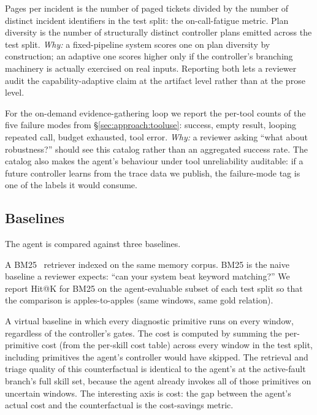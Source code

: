  Pages per incident is the number of paged tickets divided by the number of distinct incident identifiers in the test split: the on-call-fatigue metric. Plan diversity is the number of structurally distinct controller plans emitted across the test split. \emph{Why:} a fixed-pipeline system scores one on plan diversity by construction; an adaptive one scores higher only if the controller's branching machinery is actually exercised on real inputs. Reporting both lets a reviewer audit the capability-adaptive claim at the artifact level rather than at the prose level.

 For the on-demand evidence-gathering loop we report the per-tool counts of the five failure modes from \S\ref{sec:approach:tooluse}: success, empty result, looping repeated call, budget exhausted, tool error. \emph{Why:} a reviewer asking ``what about robustness?'' should see this catalog rather than an aggregated success rate. The catalog also makes the agent's behaviour under tool unreliability auditable: if a future controller learns from the trace data we publish, the failure-mode tag is one of the labels it would consume.

\subsection{Baselines}
\label{sec:evaluation:baselines}

The agent is compared against three baselines.

 A BM25~\cite{robertson2009bm25} retriever indexed on the same memory corpus. BM25 is the naive baseline a reviewer expects: ``can your system beat keyword matching?'' We report Hit@K for BM25 on the agent-evaluable subset of each test split so that the comparison is apples-to-apples (same windows, same gold relation).

 A virtual baseline in which every diagnostic primitive runs on every window, regardless of the controller's gates. The cost is computed by summing the per-primitive cost (from the per-skill cost table) across every window in the test split, including primitives the agent's controller would have skipped. The retrieval and triage quality of this counterfactual is identical to the agent's at the active-fault branch's full skill set, because the agent already invokes all of those primitives on uncertain windows. The interesting axis is cost: the gap between the agent's actual cost and the counterfactual is the cost-savings metric.

